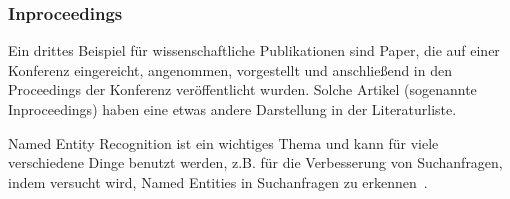 \documentclass[
     11pt,         %
     a4paper,      %
     oneside,
     ]{article}
\begin{document}
\subsubsection{Inproceedings}
Ein drittes Beispiel für wissenschaftliche Publikationen sind Paper, die auf einer Konferenz eingereicht, angenommen, vorgestellt und anschließend in den Proceedings der Konferenz veröffentlicht wurden. Solche Artikel (sogenannte Inproceedings) haben eine etwas andere Darstellung in der Literaturliste.

Named Entity Recognition ist ein wichtiges Thema und kann für viele verschiedene Dinge benutzt werden, z.B. für die Verbesserung von Suchanfragen, indem versucht wird, Named Entities in Suchanfragen zu erkennen~\cite{GuoEtAl2009}.



\newpage

\end{document}
